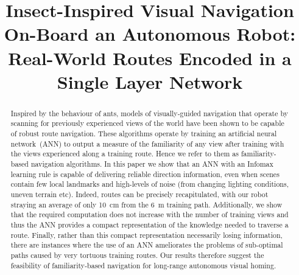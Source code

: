\documentclass[letterpaper]{article}
\title{Insect-Inspired Visual Navigation On-Board an Autonomous Robot:\\ Real-World Routes Encoded in a Single Layer Network}
\author{James C. Knight$^{1}$, Daniil Sakhapov$^{2}$, Norbert Domcsek$^{1}$, Alex Dewar$^{1}$,\\ 
{\Large Paul Graham$^{1}$, Thomas Nowotny$^{1}$ \and Andrew Philippides$^{1}$} \\
\mbox{}\\
$^1$Centre for Computational Neuroscience and Robotics, University of Sussex, Brighton, UK \\
$^2$Department of Computer Science, Tomsk State University, Tomsk, Russia \\
J.C.Knight@sussex.ac.uk} %
\begin{document}
\maketitle

\begin{abstract}
Inspired by the behaviour of ants, models of visually-guided navigation that operate by scanning for previously experienced views of the world have been shown to be capable of robust route navigation. 
These algorithms operate by training an artificial neural network~(ANN) to output a measure of the familiarity of any view after training  with the views experienced along a training route.
Hence we refer to them as familiarity-based navigation algorithms.
In this paper we show that an ANN with an Infomax learning rule is capable of delivering reliable direction information, even when scenes contain few local landmarks and high-levels of noise (from changing lighting conditions, uneven terrain etc). 
Indeed, routes can be precisely recapitulated, with our robot straying an average of only \SI{10}{\centi\metre} from the \SI{6}{\metre} training path. 
Additionally, we show that the required computation does not increase with the number of training views and thus the ANN provides a compact representation of the knowledge needed to traverse a route. 
Finally, rather than this compact representation necessarily losing information, there are instances where the use of an ANN ameliorates the problems of sub-optimal paths caused by very tortuous training routes. 
Our results therefore suggest the feasibility of familiarity-based navigation for long-range autonomous visual homing.
\end{abstract}
\end{document}
